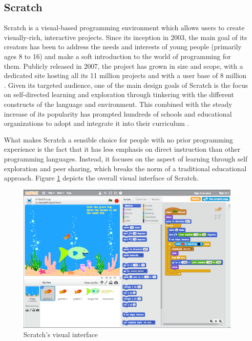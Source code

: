 \subsection{Scratch}
Scratch is a visual-based programming environment which allows users to create visually-rich, interactive projects.  Since its inception in 2003, the main goal of its creators has been to address the needs and interests of young people (primarily ages 8 to 16) and make a soft introduction to the world of programming for them. Publicly released in 2007, the project has grown in size and scope, with a dedicated site hosting all its 11 million projects and with a user base of 8 million \cite{scratchstat}.
Given its targeted audience, one of the main design goals of Scratch is the focus on self-directed learning and exploration through tinkering with the different constructs of the language and environment. This combined with the steady increase of its popularity has prompted hundreds of schools and educational organizations to adopt and integrate it into their curriculum \cite{MaloneyResnick10}.

What makes Scratch a sensible choice for people with no prior programming experience is the fact that it has less emphasis on direct instruction than other programming languages. Instead, it focuses on the aspect of learning through self exploration and peer sharing, which breaks the norm of a traditional educational approach. Figure \ref{fig:scratch_environment} depicts the overall visual interface of Scratch.

\begin{figure}[H]
\begin{center}
\includegraphics[scale=0.85]{./pics/scratch_ui.png}
\caption{Scratch's visual interface}
\label{fig:scratch_environment}
\end{center}
\end{figure}

